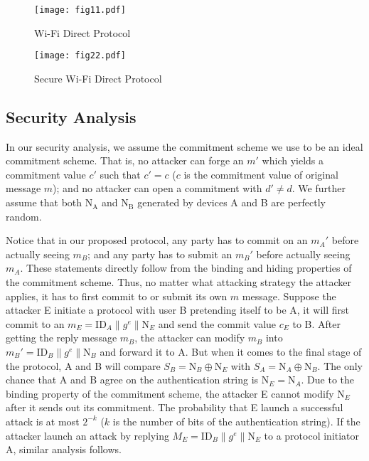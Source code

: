 \documentclass[conference]{IEEEtran}
\begin{document}
\begin{figure*}[htbp]
  \centering
  \scalebox{0.571}
  {\texttt{[image: fig11.pdf]}}
  \caption{Wi-Fi Direct Protocol}
  \label{fig:fig2}
    \vspace{-3mm}
\end{figure*}

\begin{figure*}[htbp]
  \centering
  \scalebox{0.571}
  {\texttt{[image: fig22.pdf]}}
  \caption{Secure Wi-Fi Direct Protocol}
  \label{fig:fig3}
  \vspace{-3mm}
\end{figure*}

\subsection{Security Analysis}
In our security analysis, we assume the commitment scheme we use to be an ideal commitment scheme. That is, no attacker can forge an $m'$ which yields a commitment value $c'$ such that $c'=c$ ($c$ is the commitment value of original message $m$); and no attacker can open a commitment with $d'\neq d$. We further assume that both $\mathrm{N_A}$ and $\mathrm{N_B}$ generated by devices A and B are perfectly random. 

Notice that in our proposed protocol, any party has to commit on an $m_A'$ before actually seeing $m_B$; and any party has to submit an $m_B'$ before actually seeing $m_A$. These statements directly follow from the binding and hiding properties of the commitment scheme. Thus, no matter what attacking strategy the attacker applies, it has to first commit to or submit its own $m$ message. Suppose the attacker E initiate a protocol with user B pretending itself to be A, it will first commit to an $m_E= \mathrm{ID}_A\lVert g^e\rVert \mathrm{N}_E$ and send the commit value $c_E$ to B. After getting the reply message $m_B$, the attacker can modify $m_B$ into $m_B'= \mathrm{ID}_B\lVert g^e\rVert \mathrm{N}_B$ and forward it to A. But when it comes to the final stage of the protocol, A and B will compare $S_B=\mathrm{N}_B\oplus\mathrm{N}_E$ with $S_A=\mathrm{N}_A\oplus\mathrm{N}_B$. The only chance that A and B agree on the authentication string is $\mathrm{N}_E=\mathrm{N}_A$. Due to the binding property of the commitment scheme, the attacker E cannot modify $\mathrm{N}_E$ after it sends out its commitment. The probability that E launch a successful attack is at most $2^{-k}$ ($k$ is the number of bits of the authentication string). If the attacker launch an attack by replying $M_E= \mathrm{ID}_B\lVert g^e\rVert \mathrm{N}_E$ to a protocol initiator A, similar analysis follows. 
\end{document}
